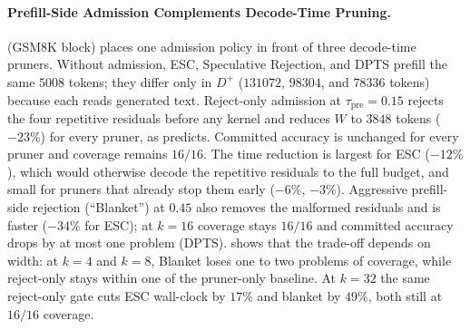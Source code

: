 \paragraph{Prefill-Side Admission Complements Decode-Time Pruning.}
 (GSM8K block) places one admission policy in front of three decode-time pruners.
Without admission, ESC, Speculative Rejection, and DPTS prefill the same $5008$ tokens; they differ only in $D^{+}$ ($131072$, $98304$, and $78336$ tokens) because each reads generated text.
Reject-only admission at $\tau_{\mathrm{pre}}{=}0.15$ rejects the four repetitive residuals before any kernel and reduces $W$ to $3848$ tokens ($-23\%$) for every pruner, as  predicts.
Committed accuracy is unchanged for every pruner and coverage remains $16/16$.
The time reduction is largest for ESC ($-12\%$), which would otherwise decode the repetitive residuals to the full budget, and small for pruners that already stop them early ($-6\%$, $-3\%$).
Aggressive prefill-side rejection (``Blanket'') at $0.45$ also removes the malformed residuals and is faster ($-34\%$ for ESC); at $k{=}16$ coverage stays $16/16$ and committed accuracy drops by at most one problem (DPTS).
 shows that the trade-off depends on width: at $k{=}4$ and $k{=}8$, Blanket loses one to two problems of coverage, while reject-only stays within one of the pruner-only baseline.
At $k{=}32$ the same reject-only gate cuts ESC wall-clock by $17\%$ and blanket by $49\%$, both still at $16/16$ coverage.

\begin{table}[t]
\centering
\caption{ESC on GSM8K across fan-out width (Qwen3-8B, $n{=}16$).
Each cell: committed / any-finished / seconds.}
\label{tab:prefill-bar}
\end{table}

